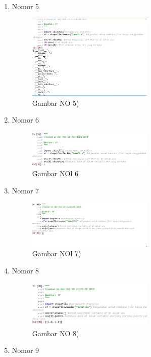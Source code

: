 \begin{enumerate}
	\item Nomor 5
	
	\begin{figure}[H]
		\includegraphics[width=6cm]{figures/Tugas3/1174080/NO5.JPG}
		\centering
		\caption{Gambar NO 5)}
	\end{figure}
	\item Nomor 6
	
	\begin{figure}[H]
		\includegraphics[width=6cm]{figures/Tugas3/1174080/NO6.JPG}
		\centering
		\caption{Gambar NOl 6}
	\end{figure}
	\item Nomor 7
	
	\begin{figure}[H]
		\includegraphics[width=6cm]{figures/Tugas3/1174080/NO7.JPG}
		\centering
		\caption{Gambar NOl 7)}
	\end{figure}
	\item Nomor 8
	
	\begin{figure}[H]
		\includegraphics[width=6cm]{figures/Tugas3/1174080/NO8.JPG}
		\centering
		\caption{Gambar NO 8)}
	\end{figure}
	\item Nomor 9
	
	\begin{figure}[H]

\end{figure}
\end{enumerate}
